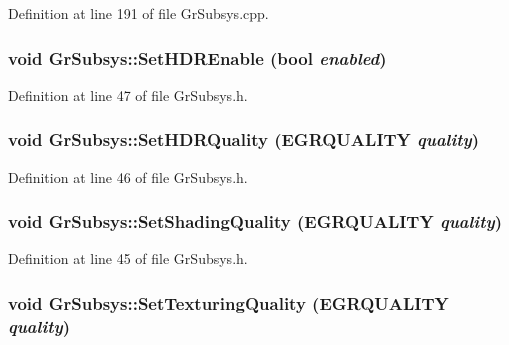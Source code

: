 Definition at line 191 of file GrSubsys.cpp.\hypertarget{class_gr_subsys_f116de3127fd9378c506fe73dbd1eb4d}{
\subsubsection[{SetHDREnable}]{\setlength{\rightskip}{0pt plus 5cm}void GrSubsys::SetHDREnable (bool {\em enabled})}}
\label{class_gr_subsys_f116de3127fd9378c506fe73dbd1eb4d}




Definition at line 47 of file GrSubsys.h.\hypertarget{class_gr_subsys_c9626c59833220674cfc79155127947f}{
\subsubsection[{SetHDRQuality}]{\setlength{\rightskip}{0pt plus 5cm}void GrSubsys::SetHDRQuality ({\bf EGRQUALITY} {\em quality})}}
\label{class_gr_subsys_c9626c59833220674cfc79155127947f}




Definition at line 46 of file GrSubsys.h.\hypertarget{class_gr_subsys_98502732472ab7e6ec14048fbd25d240}{
\subsubsection[{SetShadingQuality}]{\setlength{\rightskip}{0pt plus 5cm}void GrSubsys::SetShadingQuality ({\bf EGRQUALITY} {\em quality})}}
\label{class_gr_subsys_98502732472ab7e6ec14048fbd25d240}




Definition at line 45 of file GrSubsys.h.\hypertarget{class_gr_subsys_7950bbebe8c3f42e7048aaedd61512eb}{
\subsubsection[{SetTexturingQuality}]{\setlength{\rightskip}{0pt plus 5cm}void GrSubsys::SetTexturingQuality ({\bf EGRQUALITY} {\em quality})}}
\label{class_gr_subsys_7950bbebe8c3f42e7048aaedd61512eb}




